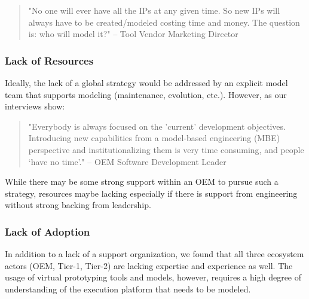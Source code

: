 \begin{quote}
"No one will ever have all the IPs at any given time. So new IPs will always have to be created/modeled costing time and money. The question is: who will model it?"
-- Tool Vendor Marketing Director
\end{quote}

\subsubsection*{Lack of Resources}
Ideally, the lack of a global strategy would be addressed by an explicit model team that supports modeling (maintenance, evolution, etc.). However, as our interviews show:

\begin{quote}
"Everybody is always focused on the 'current' development objectives. Introducing new capabilities from a model-based engineering (MBE) perspective and institutionalizing them is very time consuming, and people ‘have no time’." 
-- OEM Software Development Leader
\end{quote}

While there may be some strong support within an OEM to pursue such a strategy, resources maybe lacking especially if there is support from engineering without strong backing from leadership.

\subsubsection*{Lack of Adoption}
In addition to a lack of a support organization,
we found that all three ecosystem actors (OEM, Tier-1, Tier-2) are lacking expertise and experience as well.
The usage of virtual prototyping tools and models, however, requires a high degree of understanding of the execution platform that needs to be modeled.

